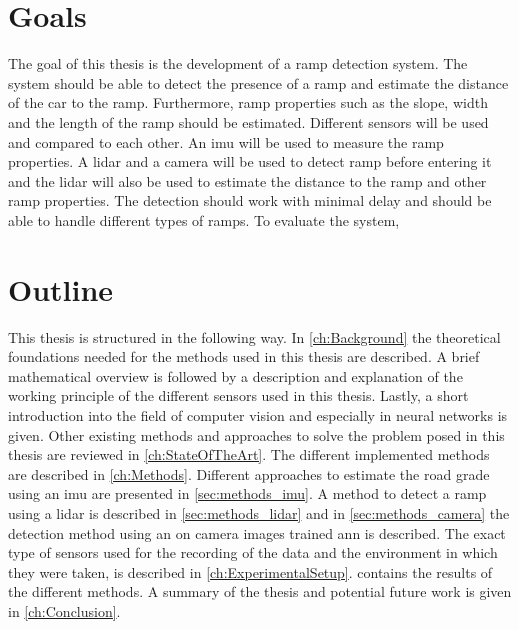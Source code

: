 \section{Goals}
The goal of this thesis is the development of a ramp detection system.
The system should be able to detect the presence of a ramp and estimate the distance of the car to the ramp.
Furthermore, ramp properties such as the slope, width and the length of the ramp should be estimated.
Different sensors will be used and compared to each other.
An \gls{imu} will be used to measure the ramp properties.
A \gls{lidar} and a camera will be used to detect ramp before entering it and the \gls{lidar} will also be used to estimate the distance to the ramp and other ramp properties.
The detection should work with minimal delay and should be able to handle different types of ramps.
To evaluate the system,





\section{Outline}
This thesis is structured in the following way.
In \cref{ch:Background} the theoretical foundations needed for the methods used in this thesis are described.
A brief mathematical overview is followed by a description and explanation of the working principle of the different sensors used in this thesis.
Lastly, a short introduction into the field of computer vision and especially in neural networks is given.
Other existing methods and approaches to solve the problem posed in this thesis are reviewed in \cref{ch:StateOfTheArt}.
The different implemented methods are described in \cref{ch:Methods}.
Different approaches to estimate the road grade using an \gls{imu} are presented in \cref{sec:methods_imu}.
A method to detect a ramp using a \gls{lidar} is described in \cref{sec:methods_lidar} and in \cref{sec:methods_camera} the detection method using an on camera images trained \gls{ann} is described.
The exact type of sensors used for the recording of the data and the environment in which they were taken, is described in \cref{ch:ExperimentalSetup}.
 contains the results of the different methods.
A summary of the thesis and potential future work is given in \cref{ch:Conclusion}.
